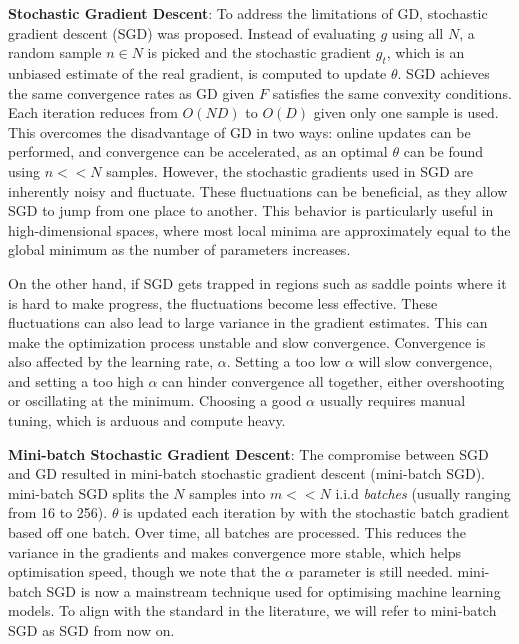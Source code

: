 \textbf{Stochastic Gradient Descent}: To address the limitations of GD, stochastic gradient descent (SGD) was proposed. Instead of evaluating $g$ using all $N$, a random sample $n \in N$ is picked and the stochastic gradient $g_t$, which is an unbiased estimate of the real gradient, is computed to update $\theta$. SGD achieves the same convergence rates as GD given $F$ satisfies the same convexity conditions. Each iteration reduces from $O(ND)$ to $O(D)$ given only one sample is used.
This overcomes the disadvantage of GD in two ways: online updates can be performed, and convergence can be accelerated, as an optimal $\theta$ can be found using $n << N$ samples. However, the stochastic gradients used in SGD are inherently noisy and fluctuate. These fluctuations can be beneficial, as they allow SGD to jump from one place to another. This behavior is particularly useful in high-dimensional spaces, where most local minima are approximately equal to the global minimum as the number of parameters increases.

On the other hand, if SGD gets trapped in regions such as saddle points where it is hard to make progress, the fluctuations become less effective. These fluctuations can also lead to large variance in the gradient estimates. This can make the optimization process unstable and slow convergence. Convergence is also affected by the learning rate, $\alpha$. Setting a too low $\alpha$ will slow convergence, and setting a too high $\alpha$ can hinder convergence all together, either overshooting or oscillating at the minimum. Choosing a good $\alpha$ usually requires manual tuning, which is arduous and compute heavy.

\textbf{Mini-batch Stochastic Gradient Descent}: The compromise between SGD and GD resulted in mini-batch stochastic gradient descent (mini-batch SGD). mini-batch SGD splits the $N$ samples into $m << N$ i.i.d \textit{batches} (usually ranging from 16 to 256). $\theta$ is updated each iteration by with the stochastic batch gradient based off one batch. Over time, all batches are processed. This reduces the variance in the gradients and makes convergence more stable, which helps optimisation speed, though we note that the $\alpha$ parameter is still needed. mini-batch SGD is now a mainstream technique used for optimising machine learning models. To align with the standard in the literature, we will refer to mini-batch SGD as SGD from now on.

